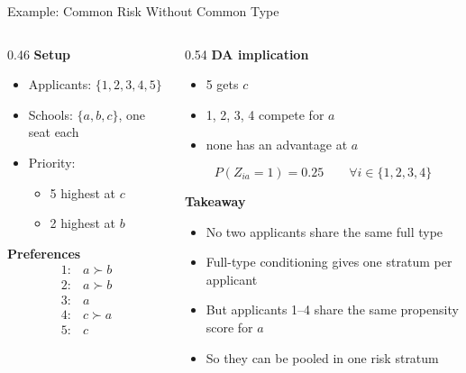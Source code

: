 \documentclass[notes,11pt, aspectratio=169]{beamer}
\begin{document}
\begin{frame}{Example: Common Risk Without Common Type}
\small
\begin{columns}[T]
\begin{column}{0.46\textwidth}
\textbf{Setup}
\begin{itemize}
    \item Applicants: $\{1,2,3,4,5\}$
    \item Schools: $\{a,b,c\}$, one seat each
    \item Priority:
    \begin{itemize}
        \item 5 highest at $c$
        \item 2 highest at $b$
    \end{itemize}
\end{itemize}




\textbf{Preferences}
\[
\begin{array}{ll}
1:& a \succ b\\
2:& a \succ b\\
3:& a\\
4:& c \succ a\\
5:& c
\end{array}
\]
\end{column}

\begin{column}{0.54\textwidth}
\textbf{DA implication}
\begin{itemize}
    \item 5 gets $c$
    \item 1, 2, 3, 4 compete for $a$
    \item none has an advantage at $a$
\end{itemize}

\[
P(Z_{ia}=1)=0.25 \qquad \forall i \in \{1,2,3,4\}
\]

\textbf{Takeaway}
\begin{itemize}
    \item No two applicants share the same full type
    \item Full-type conditioning gives one stratum per applicant
    \item But applicants 1--4 share the same propensity score for $a$
    \item So they can be pooled in one risk stratum
\end{itemize}
\end{column}
\end{columns}
\end{frame}
\end{document}
